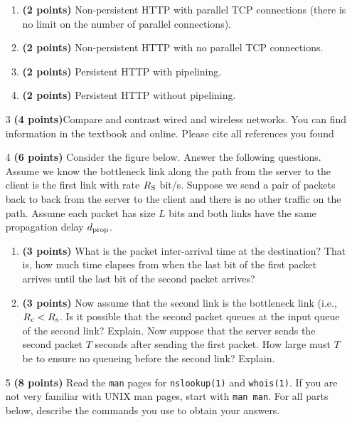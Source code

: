 \documentclass{article}
\begin{document}
\begin{enumerate}
  \begin{enumerate}
  \item \textbf{(2 points)} Non-persistent HTTP with parallel TCP connections (there is no limit on the number of parallel connections).
  \item \textbf{(2 points)} Non-persistent HTTP with no parallel TCP connections.
  \item \textbf{(2 points)} Persistent HTTP with pipelining.
  \item \textbf{(2 points)} Persistent HTTP without pipelining.
  \end{enumerate}
 
\item[3]\textbf{(4 points)}Compare and contrast wired and wireless networks. You can find information in the textbook and online. Please cite all references you found

\item[4]\textbf{(6 points)} Consider the figure below. Answer the following questions. Assume we know the bottleneck link along the path from the server to the client is the first link with rate $R\textsubscript{S}$ bit/s. Suppose we send a pair of packets back to back from the server to the client and there is no other traffic on the path. Assume each packet has size $L$ bits and both links have the same propagation delay $d\textsubscript{prop}$.

	\begin{enumerate}
    	\item \textbf{(3 points)} What is the packet inter-arrival time at the destination? That is, how much time elapses from when the last bit of the first packet arrives until the last bit of the second packet arrives?
        \item \textbf{(3 points)} Now assume that the second link is the bottleneck link (i.e., $R\textsubscript{c} < R\textsubscript{s}$. Is it possible that the second packet queues at the input queue of the second link? Explain. Now suppose that the server sends the second packet $T$ seconds after sending the first packet. How large must $T$ be to ensure no queueing before the second link? Explain.	
    \end{enumerate}
    
\item[5]\textbf{(8 points)} Read the \texttt{man} pages for \texttt{nslookup(1)} and \texttt{whois(1)}. If you are not very familiar with UNIX man pages, start with \texttt{man man}. For all parts below, describe the commands you use to obtain your answers.


\end{enumerate}
\end{document}
